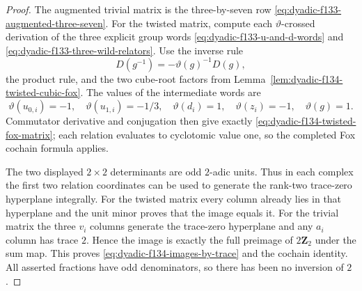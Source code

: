 \documentclass[11pt]{article}
\theoremstyle{definition}
\begin{document}
\begin{proof}
The augmented
trivial matrix is the
three-by-seven row
\eqref{eq:dyadic-f133-augmented-three-seven}.
For the twisted
matrix, compute each
$\vartheta$-crossed
derivation of the three
explicit group words
\eqref{eq:dyadic-f133-u-and-d-words}
and
\eqref{eq:dyadic-f133-three-wild-relators}.
Use the inverse rule
\[
D(g^{-1})=-\vartheta(g)^{-1}D(g),
\]
the product rule,
and the two cube-root
factors from
Lemma~\ref{lem:dyadic-f134-twisted-cubic-fox}.
The values of the
intermediate words are
\[
\vartheta(u_{0,i})=-1,\quad
\vartheta(u_{1,i})=-1/3,\quad
\vartheta(d_i)=1,\quad
\vartheta(z_i)=-1,\quad
\vartheta(g)=1.
\]
Commutator derivative
and conjugation then give
exactly
\eqref{eq:dyadic-f134-twisted-fox-matrix};
each relation evaluates
to cyclotomic value one,
so the completed Fox
cochain formula applies.

The two displayed
$2\times2$ determinants
are odd $2$-adic units.
Thus in each complex
the first two relation
coordinates can be
used to generate the
rank-two trace-zero
hyperplane integrally.
For the twisted
matrix every column
already lies in that
hyperplane and the
unit minor proves
that the image equals
it.  For the trivial
matrix the three
$v_i$ columns generate
the trace-zero
hyperplane and any
$a_i$ column has trace
$2$.  Hence the image
is exactly the full
preimage of
$2\mathbf Z_2$
under the sum map.
This proves
\eqref{eq:dyadic-f134-images-by-trace}
and the cochain identity.
All asserted fractions
have odd denominators,
so there has been
no inversion of $2$.
\end{proof}
\end{document}
